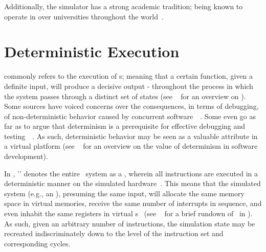 Additionally, the simulator has a strong academic tradition; being known to operate in over  universities throughout the world~.


\section{Deterministic Execution}
\label{sec:simics_deterministicexecution}
 commonly refers to the execution of \dvttermdeterministicalgorithm s; meaning that a certain function, given a definite input, will produce a decisive output - throughout the process in which the system passes through a distinct set of states (see ~ for an overview on ).
Some sources have voiced concerns over the consequences, in terms of debugging, of non-deterministic behavior caused by concurrent software~~.
Some even go as far as to argue that determinism is a prerequisite for effective debugging and testing~~.
As such, deterministic behavior may be seen as a valuable attribute in a virtual platform (see ~ for an overview on the value of determinism in software development).

In \dvttermsimics , '\dvttermdeterministicexecution ' denotes the entire \dvttermtarget\ system as a \dvttermdeterministicalgorithm , wherein all instructions are executed in a deterministic manner on the simulated hardware~.
This means that the simulated system (e.g., an \dvttermos ), presuming the same input, will allocate the same memory space in virtual memories, receive the same number of interrupts in sequence, and even inhabit the same registers in virtual \dvttermcpu s~ (see ~ for a brief rundown of \dvttermdeterministicexecution\ in \dvttermsimics ).
As such, given an arbitrary number of instructions, the simulation state may be recreated indiscriminately down to the level of the instruction set and corresponding cycles.

